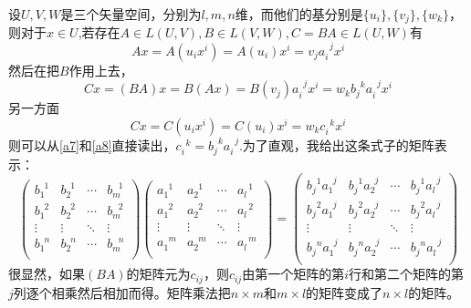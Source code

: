\documentclass[11pt,a4paper,openany]{book}%
\theoremstyle{plain}%
\begin{document}
设$U,V,W$是三个矢量空间，分别为$l,m,n$维，而他们的基分别是$\{u_i\},\{v_j\},\{w_k\}$，则对于$x\in U$,若存在$A\in L(U,V),B\in L(V,W),C=BA\in L(U,W)$有
\[
Ax=A(u_{i}x^{i})=A(u_{i})x^{i}=v_{j}a_{i}^{\,\,\,j}x^{i}
\]
然后在把$B$作用上去，
\begin{equation}
\label{a7}
Cx=(BA)x=B(Ax)=B(v_{j})a_{i}^{\,\,\,j}x^{i}=w_k b^{\,\,\,k}_ja_{i}^{\,\,\,j}x^{i}
\end{equation}
另一方面
\begin{equation}
\label{a8}
Cx=C(u_{i}x^{i})=C(u_{i})x^{i}=w_{k}c_{i}^{\,\,\,k}x^{i}
\end{equation}
则可以从\eqref{a7}和\eqref{a8}直接读出，$c_{i}^{\,\,\,k}=b^{\,\,\,k}_ja_{i}^{\,\,\,j}$.为了直观，我给出这条式子的矩阵表示：\\
\begin{equation}
\label{a9}
\begin{pmatrix}
	b_{1}^{\,\,\,1} & b_{2}^{\,\,\,1} & \cdots & b_{m}^{\,\,\,\,1}\\
	b_{1}^{\,\,\,2} & b_{2}^{\,\,\,2} & \cdots & b_{m}^{\,\,\,\,2}\\
	\vdots & \vdots & \ddots & \vdots \\
	b_{1}^{\,\,\,n} & b_{2}^{\,\,\,n} & \cdots & b_{m}^{\,\,\,\,n}\\
\end{pmatrix}
\begin{pmatrix}
	a_{1}^{\,\,\,1} & a_{2}^{\,\,\,1} & \cdots & a_{l}^{\,\,\,1}\\
	a_{1}^{\,\,\,2} & a_{2}^{\,\,\,2} & \cdots & a_{l}^{\,\,\,2}\\
	\vdots & \vdots & \ddots & \vdots \\
	a_{1}^{\,\,\,m} & a_{2}^{\,\,\,m} & \cdots & a_{l}^{\,\,\,m}\\
\end{pmatrix}
=
\begin{pmatrix}
	b^{\,\,\,1}_ja_{1}^{\,\,\,j} & b^{\,\,\,1}_ja_{2}^{\,\,\,j} & \cdots & b^{\,\,\,1}_ja_{l}^{\,\,\,j}\\
	b^{\,\,\,2}_ja_{1}^{\,\,\,j} & b^{\,\,\,2}_ja_{2}^{\,\,\,j}& \cdots & b^{\,\,\,2}_ja_{l}^{\,\,\,j}\\
	\vdots & \vdots & \ddots & \vdots \\
	b^{\,\,\,n}_ja_{1}^{\,\,\,j} & b^{\,\,\,n}_ja_{2}^{\,\,\,j}& \cdots & b^{\,\,\,n}_ja_{l}^{\,\,\,j}\\
\end{pmatrix}
\end{equation}
很显然，如果$(BA)$的矩阵元为$c_{ij}$，则$c_{ij}$由第一个矩阵的第$i$行和第二个矩阵的第$j$列逐个相乘然后相加而得。矩阵乘法把$n\times m$和$m \times l$的矩阵变成了$n \times l$的矩阵。
\end{document}
